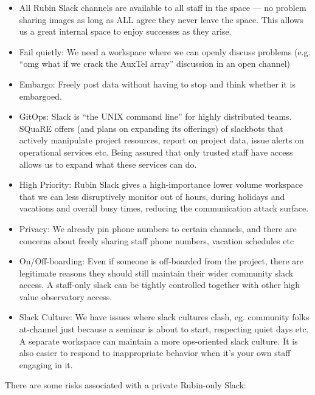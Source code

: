 \begin{itemize}
\item  All Rubin Slack channels are available to all staff in the space --- no problem sharing images as long as ALL agree they never leave the space.
This allows us a great internal space to enjoy successes as they arise.
\item  Fail quietly: We need a workspace where we can openly discuss problems (e.g. “omg what if we crack the AuxTel array” discussion in an open channel)
\item Embargo: Freely post data without having to stop and think whether it is embargoed.
\item GitOps: Slack is “the UNIX command line” for highly distributed teams. SQuaRE offers (and plans on expanding its offerings) of slackbots that actively manipulate project resources, report on project data, issue alerts on operational services etc. Being assured that only trusted staff have access allows us to expand what these services can do.
\item High Priority:  Rubin Slack gives a high-importance lower volume workspace that we can less disruptively monitor out of hours, during holidays and vacations and overall busy times, reducing the communication attack surface.
\item Privacy: We already pin phone numbers to certain channels, and there are concerns about freely sharing staff phone numbers, vacation schedules etc
\item On/Off-boarding: Even if someone is off-boarded from the project, there are legitimate reasons they should still maintain their wider community slack access. A staff-only slack can be tightly controlled together with other high value observatory access.
\item Slack Culture: We have issues where slack cultures clash, eg. community folks at-channel just because a seminar is about to start, respecting quiet days etc. A separate workspace can maintain a more ops-oriented slack culture. It is also easier to respond to inappropriate behavior when it’s your own staff engaging in it.
\end{itemize}

There are some risks associated with a private Rubin-only Slack:

